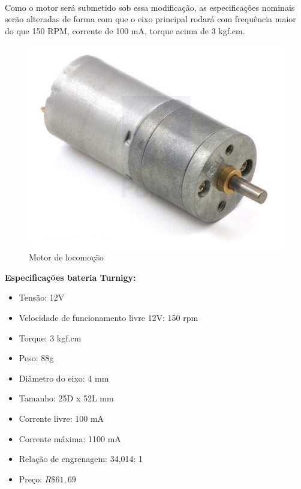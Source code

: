\documentclass{article}
\begin{document}
                \paragraph{}
                Como o motor será submetido sob essa modificação, as especificações nominais serão alteradas de forma com que o eixo principal rodará com frequência maior do que 150 RPM, corrente de 100 mA, torque acima de 3 kgf.cm.

                \begin{figure}[H]
                \includegraphics[width=\textwidth]{images/image01.jpg}
                \caption{Motor de locomoção}
                \centering
                \end{figure}

                \textbf{Especificações bateria Turnigy:}
                \begin{itemize}
                    \item Tensão: 12V
                    \item Velocidade de funcionamento livre 12V: 150 rpm
                    \item Torque: 3 kgf.cm
                    \item Peso: 88g
                    \item Diâmetro do eixo: 4 mm
                    \item Tamanho: 25D x 52L mm
                    \item Corrente livre: 100 mA
                    \item Corrente máxima: 1100 mA
                    \item Relação de engrenagem: 34,014: 1
                    \item Preço: $R\$ 61,69$
                \end{itemize}
\end{document}
